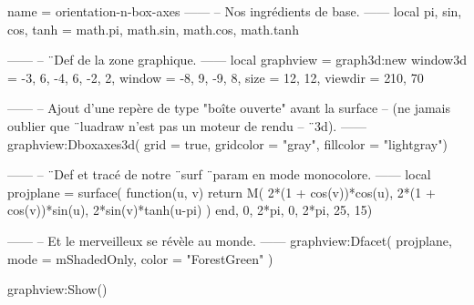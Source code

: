 \documentclass{standalone}
\begin{document}
\begin{luadraw}{name = orientation-n-box-axes}
------
-- Nos ingrédients de base.
------
local pi, sin, cos, tanh = math.pi, math.sin, math.cos, math.tanh

------
-- ¨Def de la zone graphique.
------
local graphview = graph3d:new{
  window3d = {-3, 6, -4, 6, -2, 2},
  window   = {-8, 9, -9, 8},
  size     = {12, 12},
  viewdir  = {210, 70}
}

------
-- Ajout d'une repère de type "boîte ouverte" avant la surface
-- (ne jamais oublier que ¨luadraw n'est pas un moteur de rendu
-- ¨3d).
------
graphview:Dboxaxes3d({
  grid      = true,
  gridcolor = "gray",
  fillcolor = "lightgray"})

------
-- ¨Def et tracé de notre ¨surf ¨param en mode monocolore.
------
local projplane = surface(
  function(u, v)
    return M(
      2*(1 + cos(v))*cos(u),
      2*(1 + cos(v))*sin(u),
      2*sin(v)*tanh(u-pi)
    )
  end,
  0, 2*pi, 0, 2*pi,
  {25, 15})

------
-- Et le merveilleux se révèle au monde.
------
graphview:Dfacet(
  projplane,
  {
    mode  = mShadedOnly,
    color = "ForestGreen"
  })

graphview:Show()
\end{luadraw}
\end{document}
